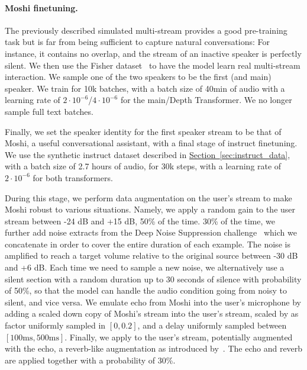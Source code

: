 \paragraph{Moshi finetuning.}
\label{sec:moshift}

The previously described simulated multi-stream provides a good pre-training task but is far from being sufficient to capture natural conversations: For instance, it contains no overlap, and the stream of an inactive speaker is perfectly silent. We then use the Fisher dataset~\citep{cieri2004fisher} to have the model learn real multi-stream interaction. We sample one of the two speakers to be the first (and main) speaker. We train for 10k batches, with a batch size of 40min of audio with a learning rate of $2\cdot 10^{-6}$/$4\cdot 10^{-6}$ for the main/Depth Transformer. We no longer sample full text batches.

Finally, we set the speaker identity for the first speaker stream to be that of Moshi, a useful conversational assistant, with a final stage of instruct finetuning. We use the synthetic instruct dataset described in \hyperref[sec:instruct_data]{Section~\ref{sec:instruct_data}}, with a batch size of 2.7 hours of audio, for 30k steps, with a learning rate of $2\cdot 10^{-6}$ for both transformers. 

During this stage, we perform data augmentation on the user's stream to make Moshi robust to various situations. Namely, we apply a random gain to the user stream between -24 dB and +15 dB, 50\% of the time. 30\% of the time, we further add noise extracts from the Deep Noise Suppression challenge~\citep{dubey2023icassp} which we concatenate in order to cover the entire duration of each example. The noise is amplified to reach a target volume relative to the original source between -30 dB and +6 dB. Each time we need to sample a new noise, we alternatively use a silent section with a random duration up to 30 seconds of silence with probability of 50\%, so that the model can handle the audio condition going from noisy to silent, and vice versa. We emulate echo from Moshi into the user's microphone by adding a scaled down copy of Moshi's stream into the user's stream, scaled by as factor uniformly sampled in $[0, 0.2]$, and a delay uniformly sampled between $[100\text{ms}, 500\text{ms}]$. Finally, we apply to the user's stream, potentially augmented with the echo, a reverb-like augmentation as introduced by~\citet{defossez2020real}. The echo and reverb are applied together with a probability of 30\%.

